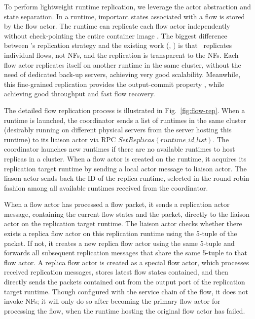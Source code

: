 To perform lightweight runtime replication, we leverage the actor
abstraction and state separation. %
In a runtime, important states associated with a flow is
stored by the flow actor. The runtime can replicate each flow actor
independently without check-pointing the entire
container image \cite{sherry2015rollback, rajagopalan2013pico}.  %
 The biggest difference between \nfactor's replication strategy and the existing work (\eg, \cite{sherry2015rollback}) is that \nfactor~replicates individual flows, not NFs, and the replication is transparent to the NFs. %
Each flow actor replicates itself on another runtime in the same cluster, without the need of dedicated back-up servers, achieving very good scalability.
Meanwhile, this fine-grained replication provides the output-commit property \cite{sherry2015rollback}, while achieving good throughput and fast flow recovery.


The detailed flow replication process is illustrated in Fig.~\ref{fig:flow-rep}. When a runtime is launched, the coordinator sends a list of runtimes in the same cluster (desirably running on different physical servers from the server hosting this runtime) to its liaison actor via RPC $SetReplicas(runtime\_id\_list)$. %
The coordinator launches new runtimes if there are no available runtimes to host replicas in a cluster. When a flow actor is created on the runtime, it acquires its replication target runtime by sending a local actor message to liaison actor. The liason actor sends back the ID of the replica runtime, selected in the round-robin fashion among all available runtimes received from the coordinator. %

When a flow actor has processed a flow packet, it sends a replication actor message, containing the current flow states and the packet, directly to the liaison actor on the replication target runtime. The liaison actor checks whether there exists a replica flow actor on this replication runtime using the 5-tuple of the packet. If not, it creates a new replica flow actor using the same 5-tuple and forwards all subsequent replication messages that share the same 5-tuple to that flow actor. A replica flow actor is created as a special flow actor, which processes received replication messages, stores latest flow states contained, and then directly sends the packets contained out from the output port of the replication target runtime. Though configured with the service chain of the flow, it does not invoke NFs; it will only do so after becoming the primary flow actor for processing the flow, when the runtime hosting the original flow actor has failed.


